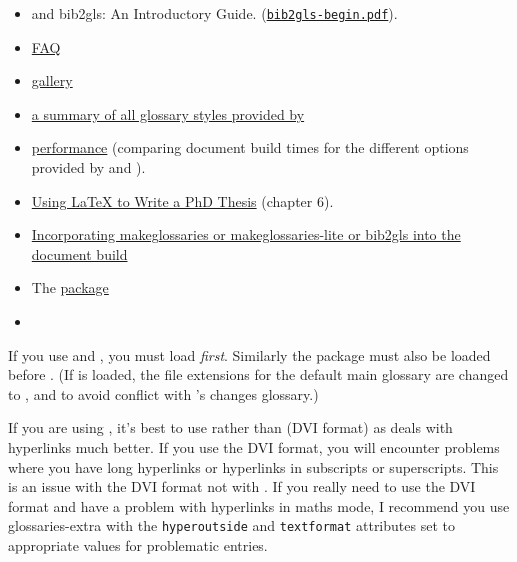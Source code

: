\documentclass[report,inlinetitle,widecs]{nlctdoc}
\newcounter{option}
\begin{document}
\begin{itemize}
\item {} and \gls{bib2gls}: An Introductory
Guide. (\href{http://mirrors.ctan.org/support/bib2gls/bib2gls-begin.pdf}{\texttt{bib2gls-begin.pdf}}).


\item \href{http://www.dickimaw-books.com/faqs/glossariesfaq.html}{
FAQ}

\item \href{http://www.dickimaw-books.com/gallery/#glossaries}{
gallery}

\item
\href{http://www.dickimaw-books.com/gallery/glossaries-styles/}{a
summary of all glossary styles provided by }

\item
\href{http://www.dickimaw-books.com/gallery/glossaries-performance.shtml}{
performance} (comparing document build times for the different
options provided by  and ).

\item \href{http://www.dickimaw-books.com/latex/thesis/}{Using LaTeX to Write a PhD Thesis}
(chapter 6).

\item
\href{https://www.dickimaw-books.com/latex/buildglossaries/}{Incorporating makeglossaries or makeglossaries-lite or bib2gls into the document build}

\item The
\href{http://ctan.org/pkg/glossaries-extra}{ package}

\item \href{http://ctan.org/pkg/bib2gls}{}
\end{itemize}

\begin{important}
If you use  and , you must load
 \emph{first}. Similarly the  package must
also be loaded before . (If  is loaded,
the file extensions for the default main glossary are changed to
,  and  to avoid
conflict with 's changes
glossary.)\hypertarget{pdflatexnote}{}%

If you are using , it's best to use 
rather than  (DVI format) as  deals with
hyperlinks much better. If you use the DVI format, you will
encounter problems where you have long hyperlinks or hyperlinks in
subscripts or superscripts. This is an issue with the DVI format not
with . If you really need to use the DVI format
and have a problem with hyperlinks in maths mode, I recommend you use
\gls{glossaries-extra} with the \texttt{hyperoutside} and
\texttt{textformat} attributes set to appropriate values 
for problematic entries.
\end{important}
\end{document}
